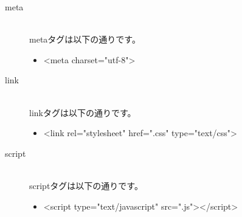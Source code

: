 \documentclass[a4j,titlepage]{jarticle}
\begin{document}
\begin{description}
\item [meta]~\\
metaタグは以下の通りです。

\begin{itemize}
\item \textless meta charset="utf-8"\textgreater
\end{itemize}


\item [link]~\\
linkタグは以下の通りです。

\begin{itemize}
\item \textless link rel="stylesheet" href=".css" type="text/css"\textgreater
\end{itemize}


\item [script]~\\
scriptタグは以下の通りです。

\begin{itemize}
\item \textless script type="text/javascript" src=".js"\textgreater \textless /script\textgreater
\end{itemize}

\end{description}
\end{document}
